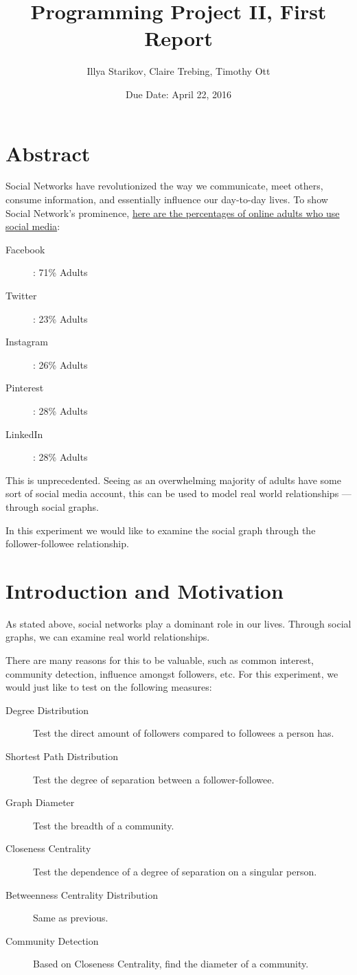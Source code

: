 \documentclass{article}
\title{Programming Project II, First Report}
\author{Illya Starikov, Claire Trebing, Timothy Ott}
\date{Due Date: April 22, 2016}
\begin{document}
\maketitle

\section{Abstract}
Social Networks have revolutionized the way we communicate, meet others, consume information, and essentially influence our day-to-day lives. To show Social Network's prominence, \href{http://www.pewinternet.org/fact-sheets/social-networking-fact-sheet/}{here are the percentages of online adults who use social media}:

\begin{description}
    \item [Facebook]: 71\% Adults
    \item [Twitter]: 23\% Adults
    \item [Instagram]: 26\% Adults
    \item [Pinterest]: 28\% Adults
    \item [LinkedIn]: 28\% Adults
\end{description}

This is unprecedented. Seeing as an overwhelming majority of adults have some sort of social media account, this can be used to model real world relationships --- through social graphs.

In this experiment we would like to examine the social graph through the follower-followee relationship.

\section{Introduction and Motivation}
As stated above, social networks play a dominant role in our lives. Through social graphs, we can examine real world relationships.

There are many reasons for this to be valuable, such as common interest, community detection, influence amongst followers, etc. For this experiment, we would just like to test on the following measures:

\begin{description}
    \item [Degree Distribution] Test the direct amount of followers compared to followees a person has.
    \item [Shortest Path Distribution] Test the degree of separation between a follower-followee.
    \item [Graph Diameter] Test the breadth of a community.
    \item [Closeness Centrality] Test the dependence of a degree of separation on a singular person.
    \item [Betweenness Centrality Distribution] Same as previous.
    \item [Community Detection] Based on Closeness Centrality, find the diameter of a community.
\end{description}
\end{document}
